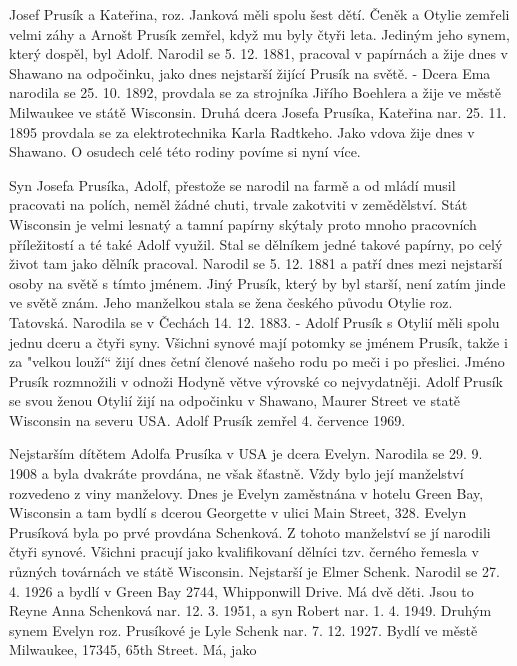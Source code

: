 \documentclass[../dejiny-rodu-prusiku.tex]{subfiles}
\begin{document}
Josef Prusík a Kateřina, roz. Janková měli spolu šest dětí. Čeněk a Otylie zemřeli velmi záhy a Arnošt Prusík zemřel, když mu byly čtyři leta. Jediným jeho synem, který dospěl, byl Adolf. Narodil se 5. 12. 1881, pracoval v papírnách a žije dnes v Shawano na odpočinku, jako dnes nejstarší žijící Prusík na světě. - Dcera Ema narodila se 25. 10. 1892, provdala se za strojníka Jiřího Boehlera a žije ve městě Milwaukee ve státě Wisconsin. Druhá dcera Josefa Prusíka, Kateřina nar. 25. 11. 1895 prov­dala se za elektrotechnika Karla Radtkeho. Jako vdova žije dnes v Shawano. O osudech celé této rodiny povíme si nyní více.

Syn Josefa Prusíka, Adolf, přestože se narodil na farmě a od mládí musil pracovati na polích, neměl žádné chuti, trvale zakotviti v zemědělství. Stát Wisconsin je velmi lesnatý a tamní papírny skýtaly proto mnoho pracovních příležitostí a té také Adolf využil. Stal se dělníkem jedné takové papírny, po celý život tam jako dělník pracoval. Narodil se 5. 12. 1881 a patří dnes me­zi nejstarší osoby na světě s tímto jménem. Jiný Prusík, který by byl starší, není zatím jinde ve světě znám. Jeho manželkou stala se žena českého původu Otylie roz. Tatovská. Narodila se v Čechách 14. 12. 1883. - Adolf Prusík s Otylií měli spolu jednu dceru a čtyři syny. Všichni synové mají potomky se jménem Prusík, takže i za "velkou louží“ žijí dnes četní členové našeho rodu po meči i po přeslici. Jméno Prusík rozmnožili v odnoži Hodyně větve výrovské co nejvydatněji. Adolf Prusík se svou ženou Otylií žijí na odpočinku v Shawano, Maurer Street ve statě Wisconsin na severu USA.  Adolf Prusík zemřel 4. července 1969.

Nejstarším dítětem Adolfa Prusíka v USA je dcera Evelyn. Narodila se 29. 9. 1908 a byla dvakráte provdána, ne však šťastně. Vždy bylo její manželství rozvedeno z viny man­želovy. Dnes je Evelyn zaměstnána v hotelu Green Bay, Wisconsin a tam bydlí s dcerou Georgette v ulici Main Street, 328. Evelyn Prusíková byla po prvé provdána Schenková. Z tohoto manželství se jí narodili čtyři synové. Všichni pracují jako kvalifikovaní dělníci tzv. černého řemesla v různých továrnách ve státě Wisconsin. Nejstarší je Elmer Schenk. Narodil se 27. 4. 1926 a bydlí v Green Bay 2744, Whipponwill Drive. Má dvě děti. Jsou to Reyne Anna Schenková nar. 12. 3. 1951, a syn Robert nar. 1. 4. 1949. Druhým synem Evelyn roz. Prusíkové je Lyle Schenk nar. 7. 12. 1927. Bydlí ve městě Milwaukee, 17345, 65th Street. Má, jako
\end{document}

